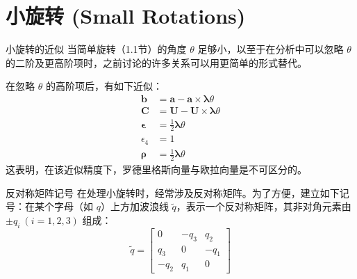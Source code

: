 \section{小旋转 (Small Rotations)}

\begin{mydefinition}{小旋转的近似}
当简单旋转（1.1节）的角度 \(\theta\) 足够小，以至于在分析中可以忽略 \(\theta\) 的二阶及更高阶项时，之前讨论的许多关系可以用更简单的形式替代。
\end{mydefinition}

在忽略 \(\theta\) 的高阶项后，有如下近似：
\begin{align}
\mathbf{b} &= \mathbf{a} - \mathbf{a} \times \boldsymbol{\lambda} \theta \tag{1} \\
\mathbf{C} &= \mathbf{U} - \mathbf{U} \times \boldsymbol{\lambda} \theta \tag{2} \\
\boldsymbol{\epsilon} &= \frac{1}{2} \boldsymbol{\lambda} \theta \tag{3} \\
\epsilon_4 &= 1 \tag{4} \\
\boldsymbol{\rho} &= \frac{1}{2} \boldsymbol{\lambda} \theta \tag{5}
\end{align}
这表明，在该近似精度下，罗德里格斯向量与欧拉向量是不可区分的。

\begin{mydefinition}{反对称矩阵记号}
在处理小旋转时，经常涉及反对称矩阵。为了方便，建立如下记号：在某个字母（如 \(q\)）上方加波浪线 \(\widetilde{q}\)，表示一个反对称矩阵，其非对角元素由 \(\pm q_i\ (i=1,2,3)\) 组成：
\begin{equation}
\widetilde{q} = \begin{bmatrix} 0 & -q_3 & q_2 \\ q_3 & 0 & -q_1 \\ -q_2 & q_1 & 0 \end{bmatrix} \tag{6}
\end{equation}
\end{mydefinition}

